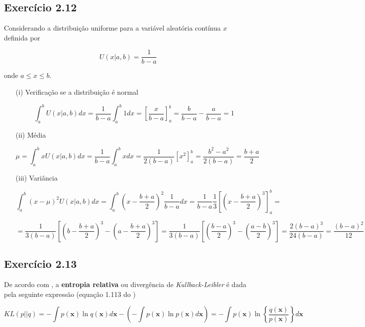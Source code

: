 \documentclass{article}
\begin{document}
\subsection{ Exerc\'icio 2.12}

    Considerando a distribuição uniforme para a variável aleatória contínua $x$  definida por
    
     \[ 
       U(x|a,b)= \frac{1}{b-a}
     \]
     
    onde $a \leq x \leq b$.
    
    \begin{enumerate}
    	\item [(i)] Verificação se a distribuição é normal
    	
    	\[
    	 \int_{a}^{b} U(x|a,b) dx = \frac{1}{b-a} \int_{a}^{b} 1 dx = \left[\frac{x}{b-a}\right]_{a}^{b}= \frac{b}{b-a} -\frac{a}{b-a}= 1
    	\]
    	
    	\item[(ii)] Média
    	
    	\[
    	  \mu = \int_{a}^{b} x U(x|a,b) dx = \frac{1}{b-a} \int_{a}^{b} x dx = \frac{1}{2(b-a)} \left[x^{2}\right]_{a}^{b}=\frac{b^{2}-a^{2}}{2(b-a)}=\frac{b+a}{2}
    	\]
    	
    	
    	\item[(iii)] Variância
    	
        \[
         \int_{a}^{b} (x-\mu)^{2} U(x|a,b) dx = \int_{a}^{b} (x-\frac{b+a}{2})^{2} \frac{1}{b-a} dx = \frac{1}{b-a}\frac{1}{3} \left[\left(x- \frac{b+a}{2}\right)^{3}\right]_{a}^{b} =
        \]	   
    
       \[
           = \frac{1}{3(b-a)}\left[\left(b-\frac{b+a}{2}\right)^{3}-\left(a-\frac{b+a}{2}\right)^{3}\right] =  \frac{1}{3(b-a)}\left[\left(\frac{b-a}{2}\right)^{3}-\left(\frac{a-b}{2}\right)^{3}\right] = \frac{2(b-a)^{3}}{24(b-a)} = \frac{(b-a)^{2}}{12}
       \]
    
    \end{enumerate} 
   
\subsection{ Exerc\'icio 2.13}
     
     De acordo com  \cite{Bishop2006}, a \textbf{entropia relativa} ou divergência de \textit{Kullback-Leibler} é dada pela seguinte expressão (equação 1.113 do \cite{Bishop2006})
     
     \[
       KL(p || q) = - \int p(\textbf{x}) \ln q(\textbf{x})d\textbf{x} - \left(-\int p(\textbf{x}) \ln p (\textbf{x}) d\textbf{x} \right) = - \int p(\textbf{x}) \ln \left\{\frac{q(\textbf{x})}{p(\textbf{x})}\right\} d\textbf{x}
     \]
   
\end{document}
